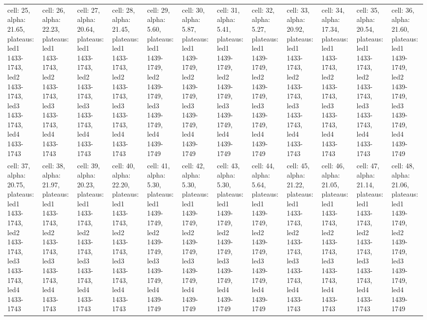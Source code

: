 \begin{landscape}
\begin{longtable}{|l|l|l|l|l|l|l|l|l|l|l|l|}
\rowcolor{lightgray} cell: 25, alpha: 21.65, plateaus: led1 1433-1743, led2 1433-1743, led3 1433-1743, led4 1433-1743 &cell: 26, alpha: 22.23, plateaus: led1 1433-1743, led2 1433-1743, led3 1433-1743, led4 1433-1743 &cell: 27, alpha: 20.64, plateaus: led1 1433-1743, led2 1433-1743, led3 1433-1743, led4 1433-1743 &cell: 28, alpha: 21.45, plateaus: led1 1433-1743, led2 1433-1743, led3 1433-1743, led4 1433-1743 &cell: 29, alpha: 5.60, plateaus: led1 1439-1749, led2 1439-1749, led3 1439-1749, led4 1439-1749 &cell: 30, alpha: 5.87, plateaus: led1 1439-1749, led2 1439-1749, led3 1439-1749, led4 1439-1749 &cell: 31, alpha: 5.41, plateaus: led1 1439-1749, led2 1439-1749, led3 1439-1749, led4 1439-1749 &cell: 32, alpha: 5.27, plateaus: led1 1439-1749, led2 1439-1749, led3 1439-1749, led4 1439-1749 &cell: 33, alpha: 20.92, plateaus: led1 1433-1743, led2 1433-1743, led3 1433-1743, led4 1433-1743 &cell: 34, alpha: 17.34, plateaus: led1 1433-1743, led2 1433-1743, led3 1433-1743, led4 1433-1743 &cell: 35, alpha: 20.54, plateaus: led1 1433-1743, led2 1433-1743, led3 1433-1743, led4 1433-1743 &cell: 36, alpha: 21.60, plateaus: led1 1439-1749, led2 1439-1749, led3 1439-1749, led4 1439-1749 \\
cell: 37, alpha: 20.75, plateaus: led1 1433-1743, led2 1433-1743, led3 1433-1743, led4 1433-1743 &cell: 38, alpha: 21.97, plateaus: led1 1433-1743, led2 1433-1743, led3 1433-1743, led4 1433-1743 &cell: 39, alpha: 20.23, plateaus: led1 1433-1743, led2 1433-1743, led3 1433-1743, led4 1433-1743 &cell: 40, alpha: 22.20, plateaus: led1 1433-1743, led2 1433-1743, led3 1433-1743, led4 1433-1743 &cell: 41, alpha: 5.30, plateaus: led1 1439-1749, led2 1439-1749, led3 1439-1749, led4 1439-1749 &cell: 42, alpha: 5.30, plateaus: led1 1439-1749, led2 1439-1749, led3 1439-1749, led4 1439-1749 &cell: 43, alpha: 5.30, plateaus: led1 1439-1749, led2 1439-1749, led3 1439-1749, led4 1439-1749 &cell: 44, alpha: 5.64, plateaus: led1 1439-1749, led2 1439-1749, led3 1439-1749, led4 1439-1749 &cell: 45, alpha: 21.22, plateaus: led1 1433-1743, led2 1433-1743, led3 1433-1743, led4 1433-1743 &cell: 46, alpha: 21.05, plateaus: led1 1433-1743, led2 1433-1743, led3 1433-1743, led4 1433-1743 &cell: 47, alpha: 21.14, plateaus: led1 1433-1743, led2 1433-1743, led3 1433-1743, led4 1433-1743 &cell: 48, alpha: 21.06, plateaus: led1 1439-1749, led2 1439-1749, led3 1439-1749, led4 1439-1749 \\

\end{longtable}
\end{landscape}
